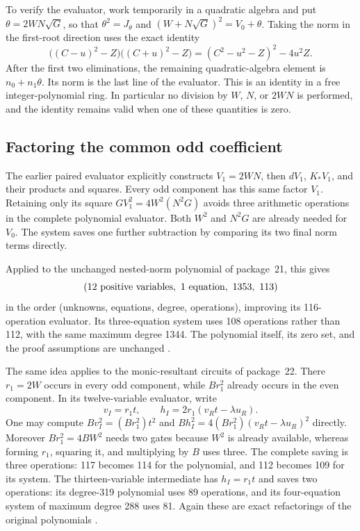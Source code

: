 \documentclass[11pt,letterpaper]{article}
\theoremstyle{remark}
\begin{document}
To verify the evaluator, work temporarily in a quadratic algebra and put
$\theta=2WN\sqrt G$, so that $\theta^2=J_\theta$ and
$(W+N\sqrt G)^2=V_0+\theta$. Taking the norm in the first-root direction
uses the exact identity
\begin{equation}
 \bigl((C-u)^2-Z\bigr)\bigl((C+u)^2-Z\bigr)
   =(C^2-u^2-Z)^2-4u^2Z.
\label{eq:circuits-symmetric}
\end{equation}
After the first two eliminations, the remaining quadratic-algebra element
is $n_0+n_1\theta$. Its norm is the last line of the evaluator. This is an
identity in a free integer-polynomial ring. In particular no division by
$W$, $N$, or $2WN$ is performed, and the identity remains valid when one of
these quantities is zero.

\subsection{Factoring the common odd coefficient}

The earlier paired evaluator explicitly constructs $V_1=2WN$, then
$dV_1$, $K_*V_1$, and their products and squares. Every odd component has
this same factor $V_1$. Retaining only its square
$G V_1^2=4W^2(N^2G)$ avoids three arithmetic operations in the complete
polynomial evaluator. Both $W^2$ and $N^2G$ are already needed for $V_0$.
The system saves one further subtraction by comparing its two final norm
terms directly.

Applied to the unchanged nested-norm polynomial of package~21, this gives
\[
 (12\hbox{ positive variables},\ 1\hbox{ equation},\ 1353,\ 113)
\]
in the order (unknowns, equations, degree, operations), improving its
116-operation evaluator. Its three-equation system uses 108 operations
rather than 112, with the same maximum degree 1344. The polynomial itself,
its zero set, and the proof assumptions are unchanged \cite{repo21}.

The same idea applies to the monic-resultant circuits of package~22.
There $r_1=2W$ occurs in every odd component, while $Br_1^2$ already occurs
in the even component. In its twelve-variable evaluator, write
\[
 v_I=r_1t,\qquad
 h_I=2r_1(v_Rt-\lambda u_R).
\]
One may compute $Bv_I^2=(Br_1^2)t^2$ and
$Bh_I^2=4(Br_1^2)(v_Rt-\lambda u_R)^2$ directly. Moreover
$Br_1^2=4BW^2$ needs two gates because $W^2$ is already available,
whereas forming $r_1$, squaring it, and multiplying by $B$ uses three.
The complete saving is three operations: 117 becomes 114 for the
polynomial, and 112 becomes 109 for its system. The thirteen-variable
intermediate has $h_I=r_1t$ and saves two operations: its degree-319
polynomial uses 89 operations, and its four-equation system of maximum
degree 288 uses 81. Again these are exact refactorings of the original
polynomials \cite{repo22}.
\end{document}
